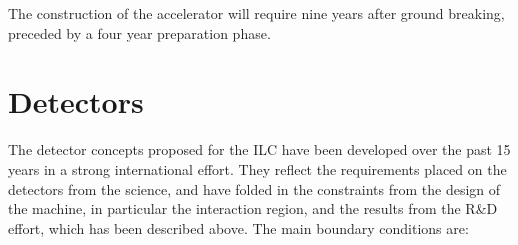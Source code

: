 \documentclass[%
 reprint,
 amsmath,amssymb,
 aps,
]{revtex4-1}
\newcommand{\todo}[1]{\textcolor{red}{{#1}}}
\begin{document}
The construction of the accelerator will require nine years after ground breaking, preceded by a four year preparation phase.




\section{\label{sec:detect} Detectors}



The detector concepts proposed for the ILC have been developed over the past 15 years in a strong international effort. They reflect the requirements placed on the detectors from the science, and have folded in the constraints from the design of the machine, in particular the interaction region, and the results from the R\&D effort, which has been described above.  
The main boundary conditions are: 
\end{document}
